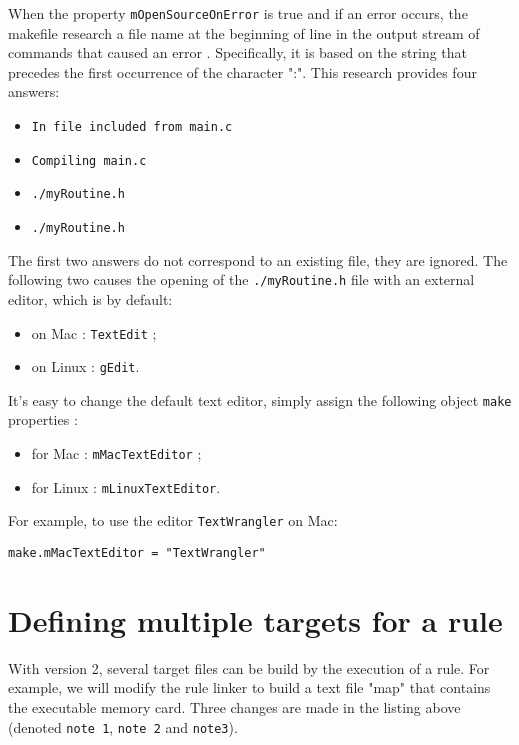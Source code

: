 \documentclass[a4paper,11pt]{extarticle}
\begin{document}
When the property \texttt{mOpenSourceOnError} is true and if an error occurs, the makefile research a file name at the beginning of line in the output stream of commands that caused an error . Specifically, it is based on the string that precedes the first occurrence of the character ":". This research provides four answers:

\begin{itemize}
\item \colorbox{lightgray!20}{\tt In file included from main.c}
\item \colorbox{lightgray!20}{\tt Compiling main.c}
\item \colorbox{lightgray!20}{\tt ./myRoutine.h}
\item \colorbox{lightgray!20}{\tt ./myRoutine.h}
\end{itemize}

The first two answers do not correspond to an existing file, they are ignored. The following two causes the opening of the \texttt{./myRoutine.h}  file with an external editor, which is by default:
\begin{itemize}
\item on Mac : \texttt{TextEdit} ;
\item on Linux : \texttt{gEdit}.
\end{itemize}

It's easy to change the default text editor, simply assign the following object  \texttt{make} properties :
\begin{itemize}
\item for Mac : \texttt{mMacTextEditor} ;
\item for Linux : \texttt{mLinuxTextEditor}.
\end{itemize}

For example, to use the editor \texttt{TextWrangler} on Mac:
\begin{lstlisting}[language=Py]
make.mMacTextEditor = "TextWrangler"
\end{lstlisting}





\section{Defining multiple targets for a rule}\label{plusieursCibles}

With version 2, several target files can be build by the execution of a rule. For example, we will modify the rule linker to build a text file "map" that contains the executable memory card. Three changes are made in the listing above (denoted \texttt{note 1}, \texttt{note 2} and \texttt{note3}).
\end{document}
